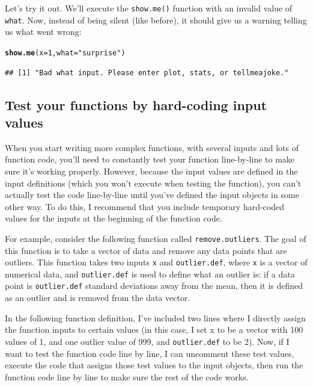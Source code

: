 \documentclass{tufte-book}\usepackage[]{graphicx}\usepackage[]{color}
\makeatletter
\newcommand{\hlnum}[1]{\textcolor[rgb]{0.686,0.059,0.569}{#1}}%
\newcommand{\hlstr}[1]{\textcolor[rgb]{0.192,0.494,0.8}{#1}}%
\newcommand{\hlstd}[1]{\textcolor[rgb]{0.345,0.345,0.345}{#1}}%
\newcommand{\hlkwc}[1]{\textcolor[rgb]{0.333,0.667,0.333}{#1}}%
\newcommand{\hlkwd}[1]{\textcolor[rgb]{0.737,0.353,0.396}{\textbf{#1}}}%
\newenvironment{kframe}{%
 \def\at@end@of@kframe{}%
 \ifinner\ifhmode%
  \def\at@end@of@kframe{\end{minipage}}%
  \begin{minipage}{\columnwidth}%
 \fi\fi%
 \def\FrameCommand##1{\hskip\@totalleftmargin \hskip-\fboxsep
 \colorbox{shadecolor}{##1}\hskip-\fboxsep
     \hskip-\linewidth \hskip-\@totalleftmargin \hskip\columnwidth}%
 \MakeFramed {\advance\hsize-\width
   \@totalleftmargin\z@ \linewidth\hsize
   \@setminipage}}%
 {\par\unskip\endMakeFramed%
 \at@end@of@kframe}
\newenvironment{knitrout}{}{} %
\makeatother
\begin{document}
Let's try it out. We'll execute the \texttt{show.me()} function with an invalid value of \texttt{what}. Now, instead of being silent (like before), it should give us a warning telling us what went wrong:

\begin{knitrout}
\color{fgcolor}\begin{kframe}
\begin{alltt}
\hlkwd{show.me}\hlstd{(}\hlkwc{x} \hlstd{=} \hlnum{1}\hlstd{,} \hlkwc{what} \hlstd{=} \hlstr{"surprise"}\hlstd{)}
\end{alltt}
\begin{verbatim}
## [1] "Bad what input. Please enter plot, stats, or tellmeajoke."
\end{verbatim}
\end{kframe}
\end{knitrout}


\subsection{Test your functions by hard-coding input values}

When you start writing more complex functions, with several inputs and lots of function code, you'll need to constantly test your function line-by-line to make sure it's working properly. However, because the input values are defined in the input definitions (which you won't execute when testing the function), you can't actually test the code line-by-line until you've defined the input objects in some other way. To do this, I recommend that you include temporary hard-coded values for the inputs at the beginning of the function code.

For example, consider the following function called \texttt{remove.outliers}. The goal of this function is to take a vector of data and remove any data points that are outliers. This function takes two inputs \texttt{x} and \texttt{outlier.def}, where \texttt{x} is a vector of numerical data, and \texttt{outlier.def} is used to define what an outlier is: if a data point is \texttt{outlier.def} standard deviations away from the mean, then it is defined as an outlier and is removed from the data vector.

In the following function definition, I've included two lines where I directly assign the function inputs to certain values (in this case, I set x to be a vector with 100 values of 1, and one outlier value of 999, and \texttt{outlier.def} to be 2). Now, if I want to test the function code line by line, I can uncomment these test values, execute the code that assigns those test values to the input objects, then run the function code line by line to make sure the rest of the code works.
\end{document}
